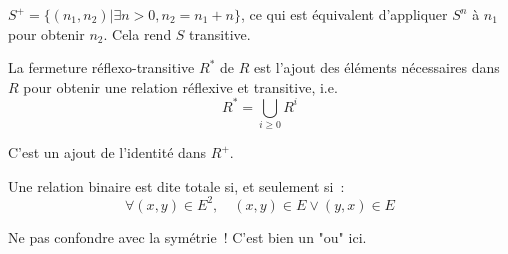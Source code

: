 \documentclass[a4paper, titlepage]{article}
\begin{document}
    \begin{exemple}
        $S^+ = \{(n_1, n_2)|\exists n > 0, n_2=n_1+n\}$, ce qui est équivalent d'appliquer $S^n$ à $n_1$ pour obtenir
        $n_2$.
        Cela rend $S$ transitive.
    \end{exemple}
    \begin{defn}
        La fermeture réflexo-transitive $R^*$ de $R$ est l'ajout des éléments nécessaires dans $R$ pour obtenir une
        relation réflexive et transitive, i.e.
        $$ R^* = \bigcup_{i\geqslant0} R^i $$
    \end{defn}
    C'est un ajout de l'identité dans $R^+$.
    \begin{defn}
        Une relation binaire est dite totale si, et seulement si~:
        $$ \forall (x,y)\in E^2,\quad (x,y)\in E\lor(y,x)\in E $$
    \end{defn}
    \begin{warn}
        Ne pas confondre avec la symétrie~! C'est bien un "ou" ici.
    \end{warn}
\end{document}
